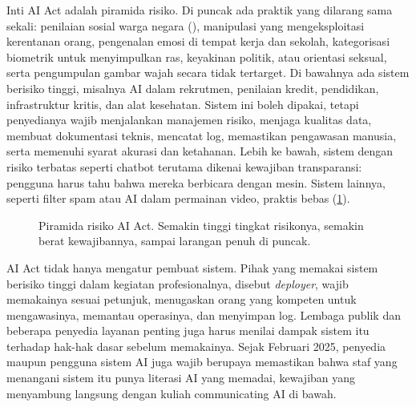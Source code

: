 Inti AI Act adalah piramida risiko. Di puncak ada praktik yang dilarang sama sekali: penilaian sosial
warga negara (), manipulasi yang mengeksploitasi kerentanan orang, pengenalan emosi
di tempat kerja dan sekolah, kategorisasi biometrik untuk menyimpulkan ras, keyakinan politik, atau
orientasi seksual, serta pengumpulan gambar wajah secara tidak tertarget. Di bawahnya ada sistem berisiko
tinggi, misalnya AI dalam rekrutmen, penilaian kredit, pendidikan, infrastruktur kritis, dan alat
kesehatan. Sistem ini boleh dipakai, tetapi penyedianya wajib menjalankan manajemen risiko, menjaga
kualitas data, membuat dokumentasi teknis, mencatat log, memastikan pengawasan manusia, serta memenuhi
syarat akurasi dan ketahanan. Lebih ke bawah, sistem dengan risiko terbatas seperti chatbot terutama
dikenai kewajiban transparansi: pengguna harus tahu bahwa mereka berbicara dengan mesin. Sistem lainnya,
seperti filter spam atau AI dalam permainan video, praktis bebas (\cref{fig:piramida}).

\begin{figure}[ht]
\centering
{}
\caption{Piramida risiko AI Act. Semakin tinggi tingkat risikonya, semakin berat kewajibannya, sampai larangan penuh di
puncak.}
\label{fig:piramida}
\end{figure}

AI Act tidak hanya mengatur pembuat sistem. Pihak yang memakai sistem berisiko tinggi dalam kegiatan profesionalnya,
disebut \emph{deployer}, wajib memakainya sesuai petunjuk, menugaskan orang yang kompeten untuk mengawasinya, memantau
operasinya, dan menyimpan log. Lembaga publik dan beberapa penyedia layanan penting juga harus menilai dampak sistem itu
terhadap hak-hak dasar sebelum memakainya. Sejak Februari 2025, penyedia maupun pengguna sistem AI juga wajib berupaya
memastikan bahwa staf yang menangani sistem itu punya literasi AI yang memadai, kewajiban yang menyambung langsung dengan
kuliah communicating AI di bawah.

